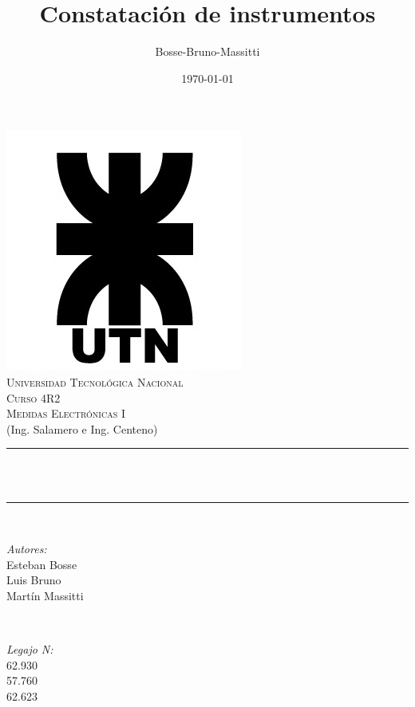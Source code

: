 \documentclass[12pt]{article}
\title{Constatación de instrumentos}								%
\author{Bosse-Bruno-Massitti}								%
\date{\today}											%
\makeatletter
\let\thetitle\@title
\let\thedate\@date
\makeatother
\begin{document}

\begin{titlepage}
	\centering
    \vspace*{0.5 cm}
    \includegraphics[scale = 0.45]{utn_logo.jpg}\\[1.0 cm]	%
    \textsc{\LARGE Universidad Tecnológica Nacional}\\[2.0 cm]	%
	\textsc{\Large Curso 4R2}\\[0.5 cm]				%
	\textsc{\large Medidas Electrónicas I}\\[0 cm]				%
	\textrm{\large (Ing. Salamero e Ing. Centeno)}\\[0.5 cm]
    \rule{\linewidth}{0.2 mm} \\[0.4 cm]
	{ \huge \bfseries \thetitle}\\
	\rule{\linewidth}{0.2 mm} \\[1 cm]
	
	\begin{minipage}{0.4\textwidth}
		\begin{flushleft} \large
			\emph{Autores:}\\
			Esteban Bosse\\Luis Bruno\\Martín Massitti
			\end{flushleft}
			\end{minipage}~
			\begin{minipage}{0.4\textwidth}
			\begin{flushright} \large
			\emph{Legajo N:} \\
			 62.930\\57.760\\62.623									%
		\end{flushright}
	\end{minipage}\\[2 cm]
	
	{\large \thedate}\\[2 cm]
 
	\vfill
	
\end{titlepage}
\end{document}
